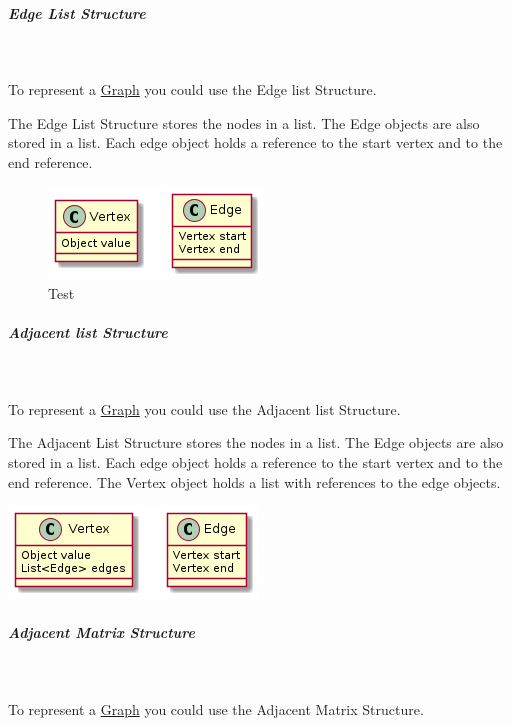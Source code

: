 \documentclass[11pt,twoside,twocolumn,landscape]{article}
\begin{document}
\subparagraph{Edge List Structure} \
\label{sec:org4e20781}

To represent a \href{../../../roam/20220201163000-graph.org}{Graph} you could use the Edge list Structure.

The Edge List Structure stores the nodes in a list.
The Edge objects are also stored in a list.
Each edge object holds a reference to the start vertex and to the end reference.


\begin{figure}[htbp]
\centering
\includegraphics[width=.9\linewidth]{img/edge_list_structure.png}
\caption{Test}
\end{figure}


\subparagraph{Adjacent list Structure} \
\label{sec:org6b2a59e}

To represent a \href{../../../roam/20220201163000-graph.org}{Graph} you could use the Adjacent list Structure.

The Adjacent List Structure stores the nodes in a list.
The Edge objects are also stored in a list.
Each edge object holds a reference to the start vertex and to the end reference.
The Vertex object holds a list with references to the edge objects.


\begin{center}
\includegraphics[width=.9\linewidth]{img/adjacent_list_structure.png}
\end{center}

\subparagraph{Adjacent Matrix Structure} \
\label{sec:org00d0e65}

To represent a \href{../../../roam/20220201163000-graph.org}{Graph} you could use the Adjacent Matrix Structure.
\end{document}
